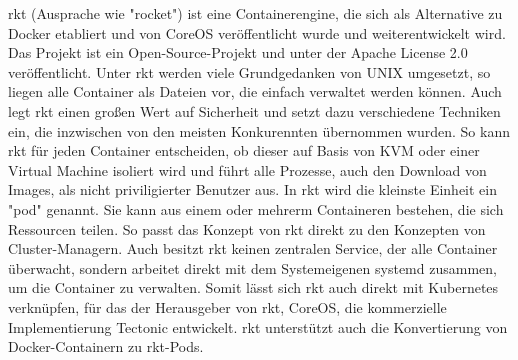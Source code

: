 rkt (Ausprache wie "rocket") ist eine Containerengine, die sich als Alternative zu Docker etabliert und von CoreOS veröffentlicht wurde und weiterentwickelt wird. Das Projekt ist ein Open-Source-Projekt und unter der Apache License 2.0 veröffentlicht.\cite{RepoRkt} Unter rkt werden viele Grundgedanken von UNIX umgesetzt, so liegen alle Container als Dateien vor, die einfach verwaltet werden können. Auch legt rkt einen großen Wert auf Sicherheit und setzt dazu verschiedene Techniken ein, die inzwischen von den meisten Konkurennten übernommen wurden. So kann rkt für jeden Container entscheiden, ob dieser auf Basis von KVM oder einer Virtual Machine isoliert wird und führt alle Prozesse, auch den Download von Images, als nicht priviligierter Benutzer aus. In rkt wird die kleinste Einheit ein "pod" genannt. Sie kann aus einem oder mehrerm Containeren bestehen, die sich Ressourcen teilen. So passt das Konzept von  rkt direkt zu den Konzepten von  Cluster-Managern. Auch besitzt rkt keinen zentralen Service, der alle Container überwacht, sondern arbeitet direkt mit dem Systemeigenen systemd zusammen, um die Container zu verwalten. Somit lässt sich rkt auch direkt mit Kubernetes verknüpfen, für das der Herausgeber von rkt, CoreOS, die kommerzielle Implementierung Tectonic entwickelt. rkt unterstützt auch die Konvertierung von Docker-Containern zu rkt-Pods.\cite{HomepageRkt,ixrkt}

